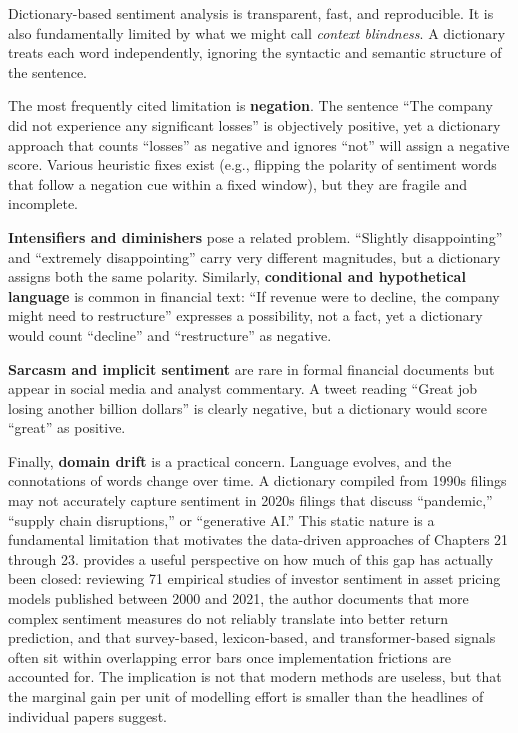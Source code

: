 Dictionary-based sentiment analysis is transparent, fast, and reproducible. It is also fundamentally limited by what we might call \textit{context blindness}. A dictionary treats each word independently, ignoring the syntactic and semantic structure of the sentence.

The most frequently cited limitation is \textbf{negation}. The sentence ``The company did not experience any significant losses'' is objectively positive, yet a dictionary approach that counts ``losses'' as negative and ignores ``not'' will assign a negative score. Various heuristic fixes exist (e.g., flipping the polarity of sentiment words that follow a negation cue within a fixed window), but they are fragile and incomplete.

\textbf{Intensifiers and diminishers} pose a related problem. ``Slightly disappointing'' and ``extremely disappointing'' carry very different magnitudes, but a dictionary assigns both the same polarity. Similarly, \textbf{conditional and hypothetical language} is common in financial text: ``If revenue were to decline, the company might need to restructure'' expresses a possibility, not a fact, yet a dictionary would count ``decline'' and ``restructure'' as negative.

\textbf{Sarcasm and implicit sentiment} are rare in formal financial documents but appear in social media and analyst commentary. A tweet reading ``Great job losing another billion dollars'' is clearly negative, but a dictionary would score ``great'' as positive.

Finally, \textbf{domain drift} is a practical concern. Language evolves, and the connotations of words change over time. A dictionary compiled from 1990s filings may not accurately capture sentiment in 2020s filings that discuss ``pandemic,'' ``supply chain disruptions,'' or ``generative AI.'' This static nature is a fundamental limitation that motivates the data-driven approaches of Chapters 21 through 23. \cite{lis2024investor} provides a useful perspective on how much of this gap has actually been closed: reviewing 71 empirical studies of investor sentiment in asset pricing models published between 2000 and 2021, the author documents that more complex sentiment measures do not reliably translate into better return prediction, and that survey-based, lexicon-based, and transformer-based signals often sit within overlapping error bars once implementation frictions are accounted for. The implication is not that modern methods are useless, but that the marginal gain per unit of modelling effort is smaller than the headlines of individual papers suggest.

